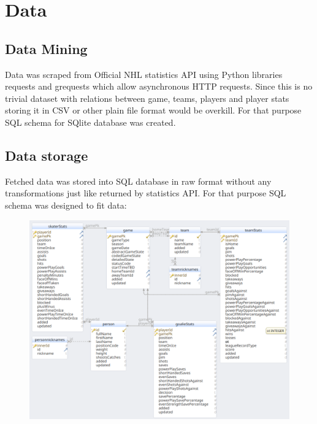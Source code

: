 \section{Data}
		\subsection{Data Mining}
			Data was scraped from Official NHL statistics API using Python libraries requests and grequests which allow asynchronous HTTP requests. 
			Since this is no trivial dataset with relations between game, teams, players and player stats storing it in CSV or other plain file format would be overkill. For that purpose SQL schema for SQlite database was created.
			
		\subsection{Data storage}
			Fetched data was stored into SQL database in raw format without any transformations just like returned by statistics API. For that purpose SQL schema was designed to fit data:
			
			\begin{figure}[H]
				\includegraphics[width=\textwidth]{dbschema}
			\end{figure}
		

